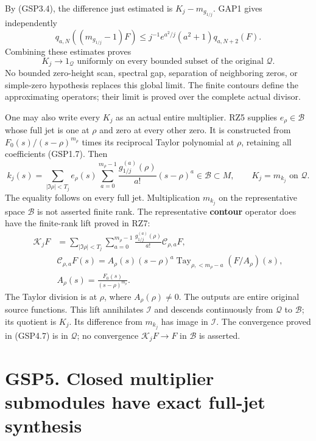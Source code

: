 By (GSP3.4), the difference just estimated is \(K_j-m_{g_{1/j}}\). GAP1
gives independently \[
q_{a,N}((m_{g_{1/j}}-1)F)
\le j^{-1}e^{a^2/j}(a^2+1)q_{a,N+2}(F).
\tag{GSP4.6}
\] Combining these estimates proves \[
\boxed{K_j\longrightarrow1_{\mathcal Q}
\text{ uniformly on every bounded subset of the original }\mathcal Q.}
\tag{GSP4.7}
\] No bounded zero-height scan, spectral gap, separation of neighboring
zeros, or simple-zero hypothesis replaces this global limit. The finite
contours define the approximating operators; their limit is proved over
the complete actual divisor.

One may also write every \(K_j\) as an actual entire multiplier. RZ5
supplies \(e_\rho\in\mathcal B\) whose full jet is one at \(\rho\) and
zero at every other zero. It is constructed from
\(F_0(s)/(s-\rho)^{m_\rho}\) times its reciprocal Taylor polynomial at
\(\rho\), retaining all coefficients (GSP1.7). Then \[
k_j(s)=\sum_{|\Im\rho|<T_j}e_\rho(s)
\sum_{a=0}^{m_\rho-1}\frac{g_{1/j}^{(a)}(\rho)}{a!}(s-\rho)^a
\in\mathcal B\subset M,\qquad K_j=m_{k_j}\text{ on }\mathcal Q.
\tag{GSP4.8}
\] The equality follows on every full jet. Multiplication \(m_{k_j}\) on
the representative space \(\mathcal B\) is not asserted finite rank. The
representative \textbf{contour} operator does have the finite-rank lift
proved in RZ7: \[
\begin{aligned}
\mathscr K_jF&=\sum_{|\Im\rho|<T_j}\sum_{a=0}^{m_\rho-1}
\frac{g_{1/j}^{(a)}(\rho)}{a!}\mathscr C_{\rho,a}F,
\\&\mathscr C_{\rho,a}F(s)=A_\rho(s)(s-\rho)^a
\operatorname{Tay}_{\rho,<m_\rho-a}(F/A_\rho)(s),
\\& A_\rho(s)=\frac{F_0(s)}{(s-\rho)^{m_\rho}}.
\end{aligned}
\tag{GSP4.9}
\] The Taylor division is at \(\rho\), where \(A_\rho(\rho)\ne0\). The
outputs are entire original source functions. This lift annihilates
\(\mathcal I\) and descends continuously from \(\mathcal Q\) to
\(\mathcal B\); its quotient is \(K_j\). Its difference from \(m_{k_j}\)
has image in \(\mathcal I\). The convergence proved in (GSP4.7) is in
\(\mathcal Q\); no convergence \(\mathscr K_jF\to F\) in \(\mathcal B\)
is asserted.

\section{GSP5. Closed multiplier submodules have exact full-jet
synthesis}\label{gsp5.-closed-multiplier-submodules-have-exact-full-jet-synthesis}

